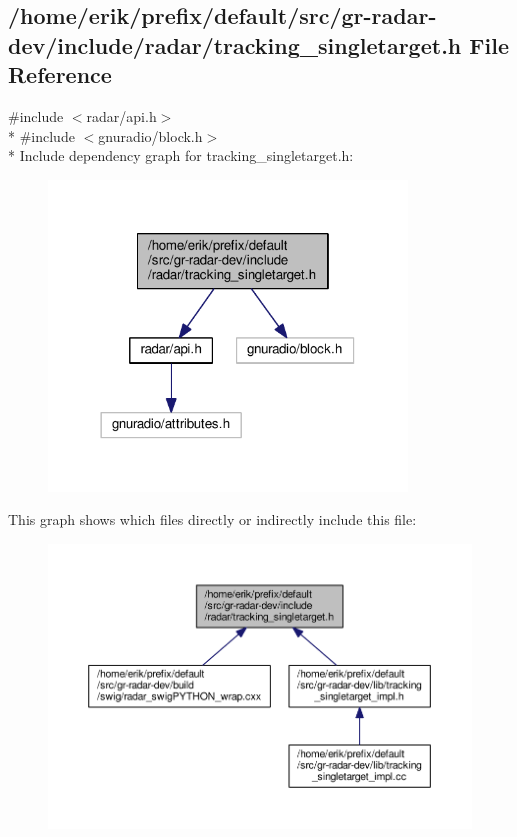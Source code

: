 \subsection{/home/erik/prefix/default/src/gr-\/radar-\/dev/include/radar/tracking\+\_\+singletarget.h File Reference}
\label{tracking__singletarget_8h}
{\ttfamily \#include $<$radar/api.\+h$>$}\\*
{\ttfamily \#include $<$gnuradio/block.\+h$>$}\\*
Include dependency graph for tracking\+\_\+singletarget.\+h\+:
\nopagebreak
\begin{figure}[H]
\begin{center}
\leavevmode
\includegraphics[width=270pt]{d7/df5/tracking__singletarget_8h__incl}
\end{center}
\end{figure}
This graph shows which files directly or indirectly include this file\+:
\nopagebreak
\begin{figure}[H]
\begin{center}
\leavevmode
\includegraphics[width=350pt]{d9/d03/tracking__singletarget_8h__dep__incl}
\end{center}
\end{figure}
